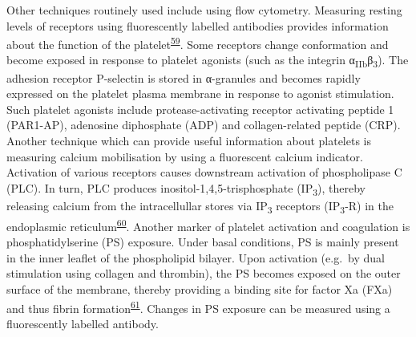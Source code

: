 \documentclass[11pt,twoside]{bristolthesis}
\begin{document}
Other techniques routinely used include using flow cytometry. Measuring resting levels of receptors using fluorescently labelled antibodies provides information about the function of the platelet\textsuperscript{\protect\hyperlink{ref-Hu2017}{59}}. Some receptors change conformation and become exposed in response to platelet agonists (such as the integrin α\textsubscript{IIb}β\textsubscript{3}). The adhesion receptor P-selectin is stored in α-granules and becomes rapidly expressed on the platelet plasma membrane in response to agonist stimulation. Such platelet agonists include protease-activating receptor activating peptide 1 (PAR1-AP), adenosine diphosphate (ADP) and collagen-related peptide (CRP). Another technique which can provide useful information about platelets is measuring calcium mobilisation by using a fluorescent calcium indicator. Activation of various receptors causes downstream activation of phospholipase C (PLC). In turn, PLC produces inositol-1,4,5-trisphosphate (IP\textsubscript{3}), thereby releasing calcium from the intracellullar stores via IP\textsubscript{3} receptors (IP\textsubscript{3}-R) in the endoplasmic reticulum\textsuperscript{\protect\hyperlink{ref-Varga-Szabo2009}{60}}. Another marker of platelet activation and coagulation is phosphatidylserine (PS) exposure. Under basal conditions, PS is mainly present in the inner leaflet of the phospholipid bilayer. Upon activation (e.g.~by dual stimulation using collagen and thrombin), the PS becomes exposed on the outer surface of the membrane, thereby providing a binding site for factor Xa (FXa) and thus fibrin formation\textsuperscript{\protect\hyperlink{ref-Bevers1983}{61}}. Changes in PS exposure can be measured using a fluorescently labelled antibody.
\end{document}
